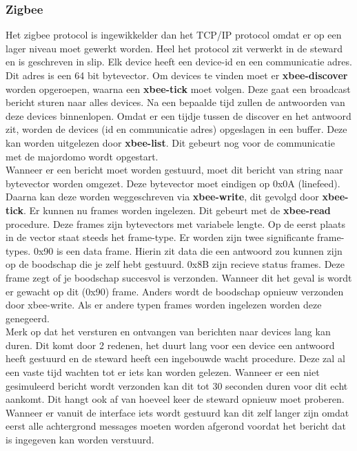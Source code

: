 \documentclass{article}
\begin{document}
\subsubsection{Zigbee}
\label{ssub:zigbee}
Het zigbee protocol is ingewikkelder dan het TCP/IP protocol omdat er op een lager niveau moet gewerkt worden. Heel het protocol zit verwerkt in de steward en is geschreven in slip. Elk device heeft een device-id en een communicatie adres. Dit adres is een 64 bit bytevector. Om devices te vinden moet er \textbf{xbee-discover} worden opgeroepen, waarna een \textbf{xbee-tick} moet volgen. Deze gaat een broadcast bericht sturen naar alles devices. Na een bepaalde tijd zullen de antwoorden van deze devices binnenlopen. Omdat er een tijdje tussen de discover en het antwoord zit, worden de devices (id en communicatie adres) opgeslagen in een buffer. Deze kan worden uitgelezen door \textbf{xbee-list}. Dit gebeurt nog voor de communicatie met de majordomo wordt opgestart.\\
Wanneer er een bericht moet worden gestuurd, moet dit bericht van string naar bytevector worden omgezet. Deze bytevector moet eindigen op 0x0A (linefeed). Daarna kan deze worden weggeschreven via \textbf{xbee-write}, dit gevolgd door \textbf{xbee-tick}. Er kunnen nu frames worden ingelezen. Dit gebeurt met de \textbf{xbee-read} procedure. Deze frames zijn bytevectors met variabele lengte. Op de eerst plaats in de vector staat steeds het frame-type. Er worden zijn twee significante frame-types. 0x90 is een data frame. Hierin zit data die een antwoord zou kunnen zijn op de boodschap die je zelf hebt gestuurd. 0x8B zijn recieve status frames. Deze frame zegt of je boodschap succesvol is verzonden. Wanneer dit het geval is wordt er gewacht op dit (0x90) frame. Anders wordt de boodschap opnieuw verzonden door xbee-write. Als er andere typen frames worden ingelezen worden deze genegeerd.\\
Merk op dat het versturen en ontvangen van berichten naar devices lang kan duren. Dit komt door 2 redenen, het duurt lang voor een device een antwoord heeft gestuurd en de steward heeft een ingebouwde wacht procedure. Deze zal al een vaste tijd wachten tot er iets kan worden gelezen. Wanneer er een niet gesimuleerd bericht wordt verzonden kan dit tot 30 seconden duren voor dit echt aankomt. Dit hangt ook af van hoeveel keer de steward opnieuw moet proberen. Wanneer er vanuit de interface iets wordt gestuurd kan dit zelf langer zijn omdat eerst alle achtergrond messages moeten worden afgerond voordat het bericht dat is ingegeven kan worden verstuurd.
\end{document}
